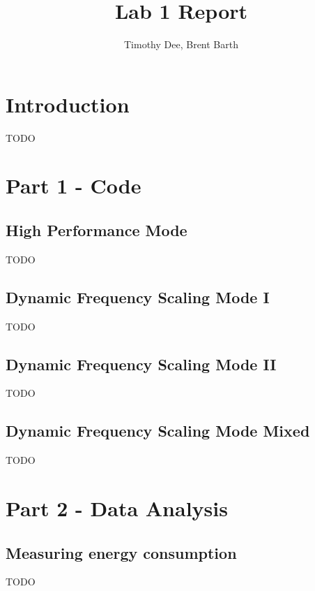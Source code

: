 \documentclass{article}	%
\author{Timothy Dee, Brent Barth}
\title{Lab 1 Report}
\begin{document}
\twocolumn
\thispagestyle{empty}		%
\maketitle			%



\section{Introduction}
TODO

\section{Part 1 - Code}
\subsection{High Performance Mode}
TODO
\subsection{Dynamic Frequency Scaling Mode I}
TODO
\subsection{Dynamic Frequency Scaling Mode II}
TODO
\subsection{Dynamic Frequency Scaling Mode Mixed}
TODO

\section{Part 2 - Data Analysis}
\subsection{Measuring energy consumption}
TODO
\end{document}
